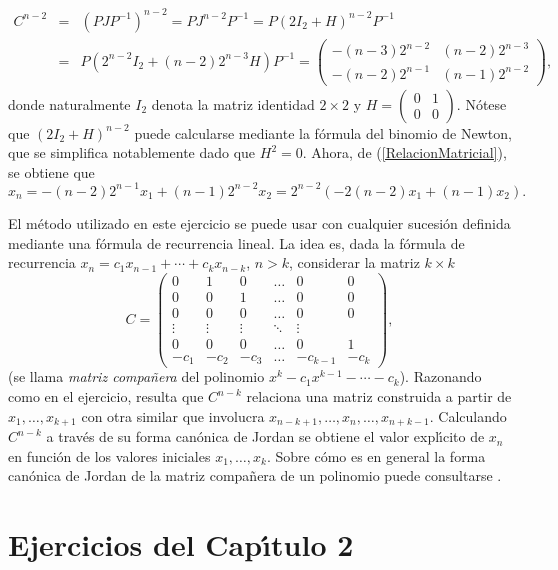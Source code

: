\begin{solucion}
\begin{eqnarray*}C^{n-2}&=&(PJP^{-1})^{n-2}=PJ^{n-2}P^{-1}=P(2I_2+H)^{n-2}P^{-1}\\&=&
P(2^{n-2}I_2+(n-2)2^{n-3}H)P^{-1}=
\begin{pmatrix}
-(n-3)2^{n-2} & (n-2)2^{n-3}\\ -(n-2)2^{n-1} & (n-1)2^{n-2}\end{pmatrix},\end{eqnarray*}
donde naturalmente $I_2$ denota la matriz identidad $2\times 2$ y $H=\begin{pmatrix}0&1\\ 0&0\end{pmatrix}$. N\'otese que $(2I_2+H)^{n-2}$ puede calcularse mediante la f\'ormula del binomio de Newton, que se simplifica notablemente dado que $H^2=0$.
Ahora, de (\ref{RelacionMatricial}), se obtiene que
$$x_n=-(n-2)2^{n-1}x_1+(n-1)2^{n-2}x_2=2^{n-2}(-2(n-2)x_1+(n-1)x_2).$$
\end{solucion}
\begin{observacion*} El m\'etodo utilizado en este ejercicio se puede usar con cualquier sucesi\'on definida mediante una f\'ormula de recurrencia lineal. La idea es, dada la f\'ormula de recurrencia $x_n=c_1x_{n-1}+\cdots +c_kx_{n-k}$, $n>k$, considerar la matriz $k\times k$
$$C=\begin{pmatrix}
0&1&0&\dots & 0 &0\\
0&0&1&\dots & 0&0\\
0&0&0&\dots & 0&0\\
\vdots&\vdots&\vdots&\ddots&\vdots\\
0&0&0&\dots&0&1\\
-c_1&-c_2&-c_3&\dots &-c_{k-1}&-c_k
\end{pmatrix},$$
(se llama \emph{matriz compa\~nera} del polinomio $x^k-c_1x^{k-1}-\cdots -c_k$). Razonando como en el ejercicio, resulta que $C^{n-k}$ relaciona una matriz construida a partir de $x_1,\dots ,x_{k+1}$ con otra similar que involucra $x_{n-k+1},\dots ,x_n,\dots,x_{n+k-1}$. Calculando $C^{n-k}$ a trav\'es de su forma can\'onica de Jordan se obtiene el valor expl\'\i cito de $x_n$ en funci\'on de los valores iniciales $x_1,\dots,x_k$. Sobre c\'omo es en general la forma can\'onica de Jordan de la matriz compa\~nera de un polinomio puede consultarse \cite[Teorema 4.3, Corolario 4.4]{Hungerford}.
\end{observacion*}

\section{Ejercicios del Cap\'\i tulo 2}

